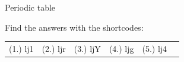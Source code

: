 \begin{eocexercises}{ Periodic table}
\begin{enumerate}[noitemsep, label=\textbf{\arabic*}. ]
\end{enumerate}
  \label{4e3d8e3d8992782b4e5d6fd958df32f9**end}
\practiceinfo
\par {} Find the answers with the shortcodes:
 \par \begin{tabular}[h]{cccccc}
 (1.) lj1  &  (2.) ljr  &  (3.) ljY  &  (4.) ljg  & (5.) lj4 \end{tabular}
\end{eocexercises}
